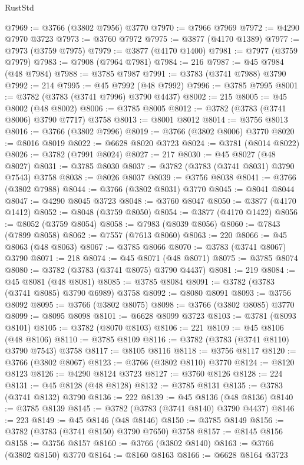 \begin{lexlean}{RustStd}
\begin{coremodule}
@7969 := @3766 (@3802 @7956) @3770
@7970 := @7966 @7969
@7972 := @4290 @7970 @3723
@7973 := @3760 @7972
@7975 := @3877 (@4170 @1389)
@7977 := @7973 (@3759 @7975)
@7979 := @3877 (@4170 @1400)
@7981 := @7977 (@3759 @7979)
@7983 := @7908 (@7964 @7981)
@7984 := 216
@7987 := @45 @7984 (@48 @7984)
@7988 := @3785 @7987
@7991 := @3783 (@3741 @7988) @3790
@7992 := 214
@7995 := @45 @7992 (@48 @7992)
@7996 := @3785 @7995
@8001 := @3782 (@3783 (@3741 @7996) @3790 @4437)
@8002 := 215
@8005 := @45 @8002 (@48 @8002)
@8006 := @3785 @8005
@8012 := @3782 (@3783 (@3741 @8006) @3790 @7717) @3758
@8013 := @8001 @8012
@8014 := @3756 @8013
@8016 := @3766 (@3802 @7996)
@8019 := @3766 (@3802 @8006) @3770
@8020 := @8016 @8019
@8022 := @6628 @8020 @3723
@8024 := @3781 (@8014 @8022)
@8026 := @3782 (@7991 @8024)
@8027 := 217
@8030 := @45 @8027 (@48 @8027)
@8031 := @3785 @8030
@8037 := @3782 (@3783 (@3741 @8031) @3790 @7543) @3758
@8038 := @8026 @8037
@8039 := @3756 @8038
@8041 := @3766 (@3802 @7988)
@8044 := @3766 (@3802 @8031) @3770
@8045 := @8041 @8044
@8047 := @4290 @8045 @3723
@8048 := @3760 @8047
@8050 := @3877 (@4170 @1412)
@8052 := @8048 (@3759 @8050)
@8054 := @3877 (@4170 @1422)
@8056 := @8052 (@3759 @8054)
@8058 := @7983 (@8039 @8056)
@8060 := @7843 (@7899 @8058)
@8062 := @7557 (@7613 @8060)
@8063 := 220
@8066 := @45 @8063 (@48 @8063)
@8067 := @3785 @8066
@8070 := @3783 (@3741 @8067) @3790
@8071 := 218
@8074 := @45 @8071 (@48 @8071)
@8075 := @3785 @8074
@8080 := @3782 (@3783 (@3741 @8075) @3790 @4437)
@8081 := 219
@8084 := @45 @8081 (@48 @8081)
@8085 := @3785 @8084
@8091 := @3782 (@3783 (@3741 @8085) @3790 @6989) @3758
@8092 := @8080 @8091
@8093 := @3756 @8092
@8095 := @3766 (@3802 @8075)
@8098 := @3766 (@3802 @8085) @3770
@8099 := @8095 @8098
@8101 := @6628 @8099 @3723
@8103 := @3781 (@8093 @8101)
@8105 := @3782 (@8070 @8103)
@8106 := 221
@8109 := @45 @8106 (@48 @8106)
@8110 := @3785 @8109
@8116 := @3782 (@3783 (@3741 @8110) @3790 @7543) @3758
@8117 := @8105 @8116
@8118 := @3756 @8117
@8120 := @3766 (@3802 @8067)
@8123 := @3766 (@3802 @8110) @3770
@8124 := @8120 @8123
@8126 := @4290 @8124 @3723
@8127 := @3760 @8126
@8128 := 224
@8131 := @45 @8128 (@48 @8128)
@8132 := @3785 @8131
@8135 := @3783 (@3741 @8132) @3790
@8136 := 222
@8139 := @45 @8136 (@48 @8136)
@8140 := @3785 @8139
@8145 := @3782 (@3783 (@3741 @8140) @3790 @4437)
@8146 := 223
@8149 := @45 @8146 (@48 @8146)
@8150 := @3785 @8149
@8156 := @3782 (@3783 (@3741 @8150) @3790 @7650) @3758
@8157 := @8145 @8156
@8158 := @3756 @8157
@8160 := @3766 (@3802 @8140)
@8163 := @3766 (@3802 @8150) @3770
@8164 := @8160 @8163
@8166 := @6628 @8164 @3723

\end{coremodule}
\end{lexlean}
